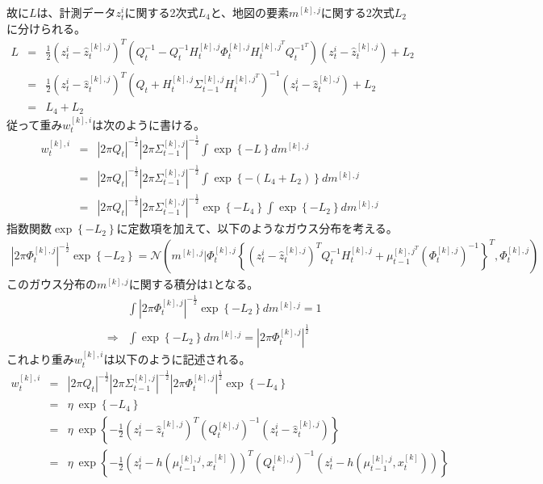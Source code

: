 \documentclass[dvipdfmx,a4paper]{jsarticle}
\begin{document}
故に$L$は、計測データ$z_t^i$に関する2次式$L_4$と、地図の要素$m^{[k], j}$に関する2次式$L_2$に分けられる。
\begin{eqnarray}
	L &=& \frac{1}{2} \left( z_t^i - \widehat{z}_t^{[k], j} \right)^T \left( Q_t^{-1} - Q_t^{-1} H_t^{[k], j} \Phi_t^{[k], j} H_t^{{[k], j}^T} Q_t^{{-1}^T} \right) \left( z_t^i - \widehat{z}_t^{[k], j} \right) + L_2 \nonumber \\
	&=& \frac{1}{2} \left( z_t^i - \widehat{z}_t^{[k], j} \right)^T \left( Q_t + H_t^{[k], j} \Sigma_{t - 1}^{[k], j} H_t^{{[k], j}^T} \right)^{-1} \left( z_t^i - \widehat{z}_t^{[k], j} \right) + L_2 \nonumber \\
	&=& L_4 + L_2 \nonumber
\end{eqnarray}
従って重み$w_t^{[k], i}$は次のように書ける。
\begin{eqnarray}
	w_t^{[k], i} &=& |2 \pi Q_t|^{-\frac{1}{2}} |2 \pi \Sigma_{t - 1}^{[k], j}|^{-\frac{1}{2}} \int \exp \left\{ -L \right\} dm^{[k], j} \nonumber \\
	&=& |2 \pi Q_t|^{-\frac{1}{2}} |2 \pi \Sigma_{t - 1}^{[k], j}|^{-\frac{1}{2}} \int \exp \left\{ - \left( L_4 + L_2 \right) \right\} dm^{[k], j} \nonumber \\
	&=& |2 \pi Q_t|^{-\frac{1}{2}} |2 \pi \Sigma_{t - 1}^{[k], j}|^{-\frac{1}{2}} \exp \left\{ -L_4 \right\} \int \exp \left\{ -L_2 \right\} dm^{[k], j}
\end{eqnarray}
指数関数$\exp \left\{ -L_2 \right\}$に定数項を加えて、以下のようなガウス分布を考える。
\begin{eqnarray}
	|2 \pi \Phi_t^{[k], j}|^{-\frac{1}{2}} \exp \left\{ -L_2 \right\} = \mathcal{N} \left( m^{[k], j} | \Phi_t^{[k], j} \left\{ \left( z_t^i - \widehat{z}_t^{[k], j} \right)^T Q_t^{-1} H_t^{[k], j} + \mu_{t - 1}^{{[k], j}^T} \left( \Phi_t^{[k], j} \right)^{-1} \right\}^T, \Phi_t^{[k], j} \right) \nonumber
\end{eqnarray}
このガウス分布の$m^{[k], j}$に関する積分は$1$となる。
\begin{eqnarray}
	&& \int |2 \pi \Phi_t^{[k], j}|^{-\frac{1}{2}} \exp \left\{ -L_2 \right\} dm^{[k], j} = 1 \nonumber \\
	&\Rightarrow& \int \exp \left\{ -L_2 \right\} dm^{[k], j} = |2 \pi \Phi_t^{[k], j}|^\frac{1}{2} \nonumber
\end{eqnarray}
これより重み$w_t^{[k], i}$は以下のように記述される。
\begin{eqnarray}
	w_t^{[k], i} &=& |2 \pi Q_t|^{-\frac{1}{2}} |2 \pi \Sigma_{t - 1}^{[k], j}|^{-\frac{1}{2}} |2 \pi \Phi_t^{[k], j}|^\frac{1}{2} \exp \left\{ -L_4 \right\} \\
	&=& \eta \ \exp \left\{ -L_4 \right\} \nonumber \\
	&=& \eta \ \exp \left\{ -\frac{1}{2} \left( z_t^i - \widehat{z}_t^{[k], j} \right)^T \left( Q_t^{[k], j} \right)^{-1} \left( z_t^i - \widehat{z}_t^{[k], j} \right) \right\} \\
	&=& \eta \ \exp \left\{ -\frac{1}{2} \left( z_t^i - h(\mu_{t - 1}^{[k], j}, x_t^{[k]}) \right)^T \left( Q_t^{[k], j} \right)^{-1} \left( z_t^i - h(\mu_{t - 1}^{[k], j}, x_t^{[k]}) \right) \right\}
\end{eqnarray}
\end{document}
